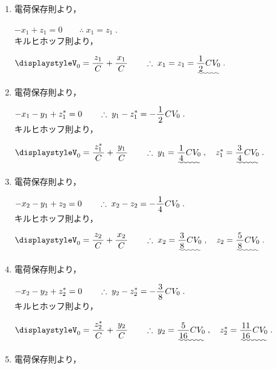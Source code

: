 \documentclass[../../../uem_phy_std_a.tex]{subfiles}
\begin{document}
    \begin{enumerate}
        \item 電荷保存則より，
            
            \myspaceb%
            $\displaystyle%
                -x_1 + z_1 = 0%
                \qquad \therefore \; x_1 = z_1 \;.
            $\\
            キルヒホッフ則より，
            
            \myspaceb%
            $\displaystyle%
                V_0 = \myfracc{z_1}{C} + \myfracc{x_1}{C}%
                \qquad \therefore \; x_1 = z_1 = \uwave{\myfraca{1}{2}CV_0} \;.
            $
        \item 電荷保存則より，
            
            \myspaceb%
            $\displaystyle%
                -x_1 - y_1+ z^*_1 = 0%
                \qquad \therefore \; y_1 - z^*_1 = -\myfraca{1}{2}CV_0  \;.
            $\\
            キルヒホッフ則より，
            
            \myspaceb%
            $\displaystyle%
                V_0 = \myfracc{z^*_1}{C} + \myfracc{y_1}{C}%
                \qquad \therefore \; y_1 = \uwave{\myfraca{1}{4}CV_0} \;,%
                \quad z^*_1 = \uwave{\myfraca{3}{4}CV_0} \;.
            $
        \item 電荷保存則より，
            
            \myspaceb%
            $\displaystyle%
                -x_2 - y_1 + z_2 = 0%
                \qquad \therefore \; x_2 - z_2 = -\myfraca{1}{4}CV_0 \;.
            $\\
            キルヒホッフ則より，
            
            \myspaceb%
            $\displaystyle%
                V_0 = \myfracc{z_2}{C} + \myfracc{x_2}{C}%
                \qquad \therefore \; x_2 = \uwave{\myfraca{3}{8}CV_0} \;,%
                \quad z_2 = \uwave{\myfraca{5}{8}CV_0} \;.
            $
        \item 電荷保存則より，
            
            \myspaceb%
            $\displaystyle%
                -x_2 - y_2 + z^*_2 = 0%
                \qquad \therefore \; y_2 - z^*_2 = -\myfraca{3}{8}CV_0 \;.
            $\\
            キルヒホッフ則より，
            
            \myspaceb%
            $\displaystyle%
                V_0 = \myfracc{z^*_2}{C} + \myfracc{y_2}{C}%
                \qquad \therefore \; y_2 = \uwave{\myfraca{5}{16}CV_0} \;,%
                \quad z^*_2 = \uwave{\myfraca{11}{16}CV_0} \;.
            $
        \item 電荷保存則より，
            

\end{enumerate}
\end{document}
